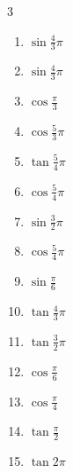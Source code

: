 \begin{multicols}{3}
\begin{enumerate}
  \item $\displaystyle \sin{\frac{4}{3}\pi}$

  \item $\displaystyle \sin{\frac{4}{3}\pi}$

  \item $\displaystyle \cos{\frac{\pi}{3}}$

  \item $\displaystyle \cos{\frac{5}{3}\pi}$

  \item $\displaystyle \tan{\frac{5}{4}\pi}$
        \phantom{$\displaystyle =1$}

  \item $\displaystyle \cos{\frac{5}{4}\pi}$

  \item $\displaystyle \sin{\frac{3}{2}\pi}$
        \phantom{$\displaystyle =-1$}

  \item $\displaystyle \cos{\frac{5}{4}\pi}$

  \item $\displaystyle \sin{\frac{\pi}{6}}$

  \item $\displaystyle \tan{\frac{4}{3}\pi}$

  \item $\displaystyle \tan{\frac{3}{2}\pi}$
        \phantom{$\displaystyle \quad なし$}

  \item $\displaystyle \cos{\frac{\pi}{6}}$

  \item $\displaystyle \cos{\frac{\pi}{4}}$

\columnbreak %

  \item $\displaystyle \tan{\frac{\pi}{2}}$
        \phantom{$\displaystyle \quad なし$}

  \item $\displaystyle \tan{2\pi}$
        \phantom{$\displaystyle =0$}


\end{enumerate}
\end{multicols}
